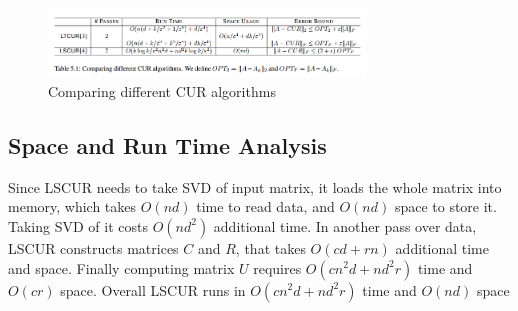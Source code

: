 \documentclass{article}
\begin{document}
\begin{figure}
    \centering
    \includegraphics[width=0.75\textwidth]{Figures/cur_compare.png}
    \caption{Comparing different CUR algorithms}
    \label{fig:my_label}
\end{figure}
\subsection{Space and Run Time Analysis}

Since LSCUR needs to take SVD of input matrix, it loads the whole matrix into memory, which takes $O(nd)$
time to read data, and $O(nd)$ space to store it. Taking SVD of it costs $O(nd^2)$ additional time. In another pass over data, LSCUR constructs matrices $C$ and $R$, that takes $O(cd + rn)$ additional time and space. Finally
computing matrix $U$ requires $O(cn^2d + nd^2r)$ time and $O(cr)$ space. Overall LSCUR runs in $O(cn^2d + nd^2r)$
time and $O(nd)$ space


\begin{figure}[ht]
 \centering    
 \end{figure}

\begin{figure}[ht]
 \centering    
\end{figure}
\end{document}
